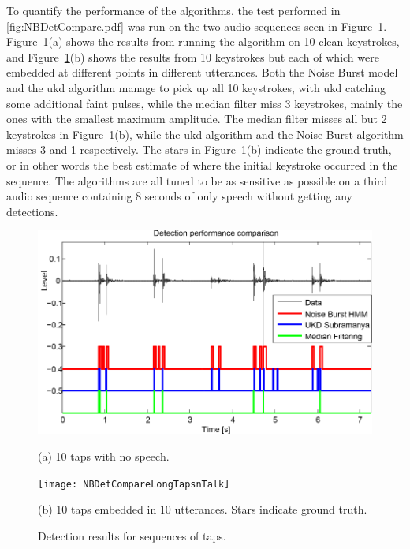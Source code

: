 To quantify the performance of the algorithms, the test performed in \ref{fig:NBDetCompare.pdf} was run on the two audio sequences seen in Figure~\ref{fig:NBDetectionResults}. Figure~\ref{fig:NBDetectionResults}(a) shows the results from running the algorithm on 10 clean keystrokes, and Figure~\ref{fig:NBDetectionResults}(b) shows the results from 10 keystrokes but each of which were embedded at different points in different utterances. Both the Noise Burst model and the \gls{ukd} algorithm manage to pick up all 10 keystrokes, with \gls{ukd} catching some additional faint pulses, while the median filter miss 3 keystrokes, mainly the ones with the smallest maximum amplitude. The median filter misses all but 2 keystrokes in Figure~\ref{fig:NBDetectionResults}(b), while the \gls{ukd} algorithm and the Noise Burst algorithm misses 3 and 1 respectively. The stars in Figure~\ref{fig:NBDetectionResults}(b) indicate the ground truth, or in other words the best estimate of where the initial keystroke occurred in the sequence. The algorithms are all tuned to be as sensitive as possible on a third audio sequence containing 8 seconds of only speech without getting any detections.

\begin{figure}
\begin{minipage}[b]{1.0\linewidth}
  \centering
  \centerline{\includegraphics[width=12.5cm]{NBDetCompareLongTaps}}
  \centerline{(a) 10 taps with no speech.}\medskip
\end{minipage}
%
\begin{minipage}[b]{1.0\linewidth}
  \centering
  \centerline{\texttt{[image: NBDetCompareLongTapsnTalk]}}
  \centerline{(b) 10 taps embedded in 10 utterances. Stars indicate ground truth.}\medskip
\end{minipage}
\hfill
%
\caption{Detection results for sequences of taps.}
\label{fig:NBDetectionResults}
\end{figure}


